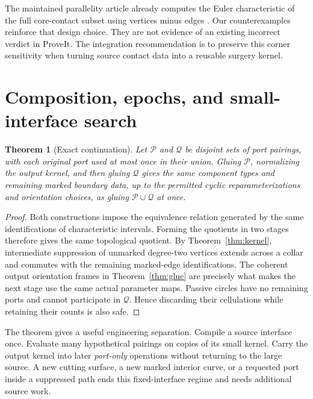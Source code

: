\documentclass[11pt]{article}
\newtheorem{theorem}{Theorem}[section]
\theoremstyle{definition}
\theoremstyle{remark}\newtheorem{remark}[theorem]{Remark}
\begin{document}
The maintained parallelity article already computes the Euler characteristic of the full core-contact subset using vertices minus edges \cite{parallelity}. Our counterexamples reinforce that design choice. They are not evidence of an existing incorrect verdict in ProveIt. The integration recommendation is to preserve this corner sensitivity when turning source contact data into a reusable surgery kernel.

\section{Composition, epochs, and small-interface search}
\label{sec:composition}

\begin{theorem}[Exact continuation]\label{thm:composition}
Let $\mathcal P$ and $\mathcal Q$ be disjoint sets of port pairings, with each original port used at most once in their union. Gluing $\mathcal P$, normalizing the output kernel, and then gluing $\mathcal Q$ gives the same component types and remaining marked boundary data, up to the permitted cyclic reparameterizations and orientation choices, as gluing $\mathcal P\cup\mathcal Q$ at once.
\end{theorem}
\begin{proof}
Both constructions impose the equivalence relation generated by the same identifications of characteristic intervals. Forming the quotients in two stages therefore gives the same topological quotient. By Theorem~\ref{thm:kernel}, intermediate suppression of unmarked degree-two vertices extends across a collar and commutes with the remaining marked-edge identifications. The coherent output orientation frames in Theorem~\ref{thm:glue} are precisely what makes the next stage use the same actual parameter maps. Passive circles have no remaining ports and cannot participate in $\mathcal Q$. Hence discarding their cellulations while retaining their counts is also safe.
\end{proof}

The theorem gives a useful engineering separation. Compile a source interface once. Evaluate many hypothetical pairings on copies of its small kernel. Carry the output kernel into later \emph{port-only} operations without returning to the large source. A new cutting surface, a new marked interior curve, or a requested port inside a suppressed path ends this fixed-interface regime and needs additional source work.
\end{document}
